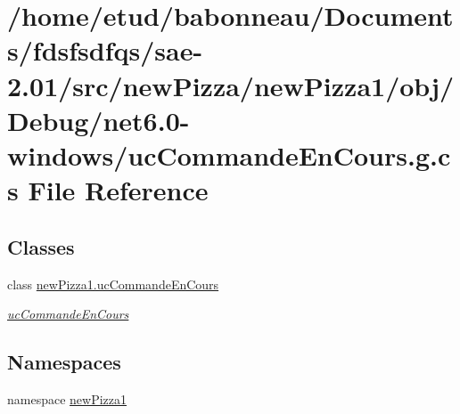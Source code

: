 \hypertarget{Debug_2net6_80-windows_2ucCommandeEnCours_8g_8cs}{}\section{/home/etud/babonneau/\+Documents/fdsfsdfqs/sae-\/2.01/src/new\+Pizza/new\+Pizza1/obj/\+Debug/net6.0-\/windows/uc\+Commande\+En\+Cours.g.\+cs File Reference}
\label{Debug_2net6_80-windows_2ucCommandeEnCours_8g_8cs}
\subsection*{Classes}
\begin{DoxyCompactItemize}
\item 
class \hyperlink{classnewPizza1_1_1ucCommandeEnCours}{new\+Pizza1.\+uc\+Commande\+En\+Cours}
\begin{DoxyCompactList}\small\item\em \hyperlink{classnewPizza1_1_1ucCommandeEnCours}{uc\+Commande\+En\+Cours} \end{DoxyCompactList}\end{DoxyCompactItemize}
\subsection*{Namespaces}
\begin{DoxyCompactItemize}
\item 
namespace \hyperlink{namespacenewPizza1}{new\+Pizza1}
\end{DoxyCompactItemize}
